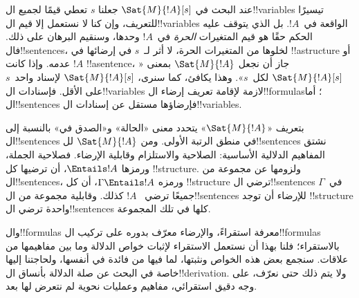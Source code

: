 \documentclass[../../../include/open-logic-section]{subfiles}
\begin{document}


عند البحث في $\Sat{M}{!A}[s]$ جعلنا $s$ تعطي قيمًا لجميع
ال!!{variable}s تيسيرًا للتعريف، وإن كنا لا نستعمل إلا قيم
ال!!{variable}s الواقعة في~$!A$. بل الذي يتوقف عليه الحكم حقًا
هو قيم المتغيرات \emph{الحرة} في~$!A$ وحدها، وسنقيم البرهان على
ذلك. فال!!{sentence}s، لخلوها من المتغيرات الحرة، لا أثر
لـ~$s$ في إرضائها في !!a{structure} أو عدمه. وإذا كانت $!A$
!!a{sentence}، جاز أن نجعل $\Sat{M}{!A}$ بمعنى
«$\Sat{M}{!A}[s]$ لكل~$s$». وهذا يكافئ، كما سنرى،
$\Sat{M}{!A}[s]$ لإسناد واحد~$s$ على الأقل. فإسنادات
ال!!{variable}s لازمة لإقامة تعريف إرضاء ال!!{formula}s؛ أما
ال!!{sentence}s فإرضاؤها مستقل عن إسنادات ال!!{variable}s.

بتعريف «$\Sat{M}{!A}$» يتحدد معنى «الحالة» و«الصدق في» بالنسبة
إلى ال!!{sentence}s في منطق الرتبة الأولى. ومن
$\Sat{M}{!A}$ لل!!{sentence}s نشتق المفاهيم الدلالية الأساسية:
الصلاحية والاستلزام وقابلية الإرضاء. فصلاحية الجملة، ورمزها
$\Entails !A$، أن ترضيها كل !!{structure}. ولزومها عن
مجموعة من ال!!{sentence}s، ورمزه $\Gamma \Entails !A$، أن كل
!!{structure} ترضي ال!!{sentence}s في~$\Gamma$ جميعًا ترضي
~$!A$ كذلك. وقابلية مجموعة من ال!!{sentence}s للإرضاء أن توجد
!!{structure} واحدة ترضي ال!!{sentence}s كلها في تلك المجموعة.

وال!!{formula}s معرفة استقراءً، والإرضاء معرّف بدوره على تركيب
ال!!{formula}s بالاستقراء؛ فلنا بهذا أن نستعمل الاستقراء لإثبات
خواص الدلالة وما بين مفاهيمها من علاقات. سنجمع بعض هذه الخواص
ونثبتها، لما فيها من فائدة في أنفسها، ولحاجتنا إليها خاصة في
البحث عن صلة الدلالة بأنساق ال!!{derivation}. ولا يتم ذلك حتى
نعرّف، على وجه دقيق استقرائي، مفاهيم وعمليات نحوية لم نتعرض لها
بعد.
\end{document}
